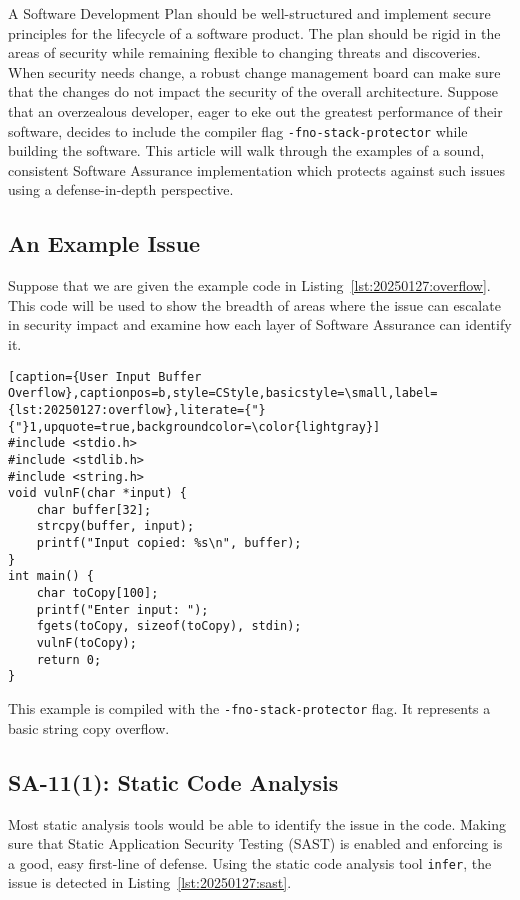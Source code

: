 A Software Development Plan should be well-structured and implement secure principles for the lifecycle of a software product. The plan should be rigid in the areas of security while remaining flexible to changing threats and discoveries. When security needs change, a robust change management board can make sure that the changes do not impact the security of the overall architecture. Suppose that an overzealous developer, eager to eke out the greatest performance of their software, decides to include the compiler flag \texttt{-fno-stack-protector} while building the software. This article will walk through the examples of a sound, consistent Software Assurance implementation which protects against such issues using a defense-in-depth perspective.

\subsection*{An Example Issue}
Suppose that we are given the example code in Listing~\ref{lst:20250127:overflow}. This code will be used to show the breadth of areas where the issue can escalate in security impact and examine how each layer of Software Assurance can identify it.

\begin{lstlisting}[caption={User Input Buffer Overflow},captionpos=b,style=CStyle,basicstyle=\small,label={lst:20250127:overflow},literate={"}{"}1,upquote=true,backgroundcolor=\color{lightgray}]
#include <stdio.h>
#include <stdlib.h>
#include <string.h>
void vulnF(char *input) {
    char buffer[32];
    strcpy(buffer, input); 
    printf("Input copied: %s\n", buffer);
}
int main() {
    char toCopy[100]; 
    printf("Enter input: ");
    fgets(toCopy, sizeof(toCopy), stdin);
    vulnF(toCopy);
    return 0;
}
\end{lstlisting}

This example is compiled with the \texttt{-fno-stack-protector} flag. It represents a basic string copy overflow.

\subsection*{SA-11(1): Static Code Analysis}
Most static analysis tools would be able to identify the issue in the code. Making sure that Static Application Security Testing (SAST) is enabled and enforcing is a good, easy first-line of defense. Using the static code analysis tool \texttt{infer}, the issue is detected in Listing~\ref{lst:20250127:sast}.


